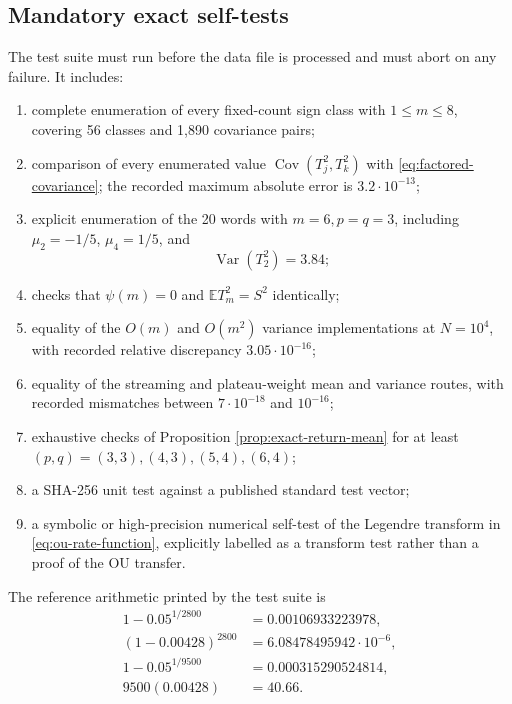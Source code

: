 \documentclass[11pt,reqno]{amsart}
\numberwithin{equation}{section}
\theoremstyle{plain}
\theoremstyle{definition}
\theoremstyle{remark}
\newcommand{\E}{\mathbb E}
\newcommand{\Var}{\operatorname{Var}}
\newcommand{\Cov}{\operatorname{Cov}}
\begin{document}
\subsection{Mandatory exact self-tests}
\label{subsec:mandatory-self-tests}

The test suite must run before the data file is processed and must abort on
any failure.  It includes:
\begin{enumerate}[label=(\roman*)]
\item complete enumeration of every fixed-count sign class with
\(1\leq m\leq8\), covering 56 classes and 1,890 covariance pairs;
\item comparison of every enumerated value
\(\Cov(T_j^2,T_k^2)\) with
\eqref{eq:factored-covariance}; the recorded maximum absolute error is
\(3.2\cdot10^{-13}\);
\item explicit enumeration of the 20 words with \(m=6,p=q=3\), including
\(\mu_2=-1/5\), \(\mu_4=1/5\), and
\begin{equation}
\Var(T_2^2)=3.84;
\label{eq:m-six-variance-test}
\end{equation}
\item checks that \(\psi(m)=0\) and
\(\E T_m^2=S^2\) identically;
\item equality of the \(O(m)\) and \(O(m^2)\) variance implementations at
\(N=10^4\), with recorded relative discrepancy \(3.05\cdot10^{-16}\);
\item equality of the streaming and plateau-weight mean and variance routes,
with recorded mismatches between \(7\cdot10^{-18}\) and \(10^{-16}\);
\item exhaustive checks of Proposition \ref{prop:exact-return-mean} for at
least \((p,q)=(3,3),(4,3),(5,4),(6,4)\);
\item a SHA-256 unit test against a published standard test vector;
\item a symbolic or high-precision numerical self-test of the Legendre
transform in \eqref{eq:ou-rate-function}, explicitly labelled as a transform
test rather than a proof of the OU transfer.
\end{enumerate}

The reference arithmetic printed by the test suite is
\begin{align}
1-0.05^{1/2800}&=0.00106933223978,
\label{eq:reference-upper-2800}\\
(1-0.00428)^{2800}&=6.08478495942\cdot10^{-6},
\label{eq:reference-zero-2800}\\
1-0.05^{1/9500}&=0.000315290524814,
\label{eq:reference-upper-9500}\\
9500(0.00428)&=40.66.
\label{eq:reference-expected-9500}
\end{align}
\end{document}
